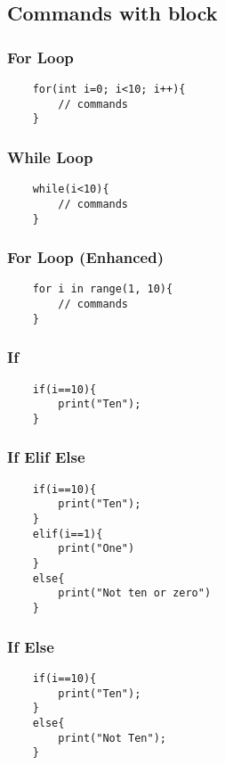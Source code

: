 \documentclass[12pt,letterpaper]{article}
\begin{document}
\subsection{Commands with block}
\subsubsection{For Loop}
\begin{verbatim}
    for(int i=0; i<10; i++){
        // commands
    }
\end{verbatim}

\subsubsection{While Loop}
\begin{verbatim}
    while(i<10){
        // commands
    }
\end{verbatim}

\subsubsection{For Loop (Enhanced)}
\begin{verbatim}
    for i in range(1, 10){
        // commands
    }
\end{verbatim}

\subsubsection{If}
\begin{verbatim}
    if(i==10){
        print("Ten");
    }
\end{verbatim}

\subsubsection{If Elif Else}
\begin{verbatim}
    if(i==10){
        print("Ten");
    }
    elif(i==1){
        print("One")
    }
    else{
        print("Not ten or zero")
    }
\end{verbatim}

\subsubsection{If Else}
\begin{verbatim}
    if(i==10){
        print("Ten");
    }
    else{
        print("Not Ten");
    }
\end{verbatim}
\end{document}
